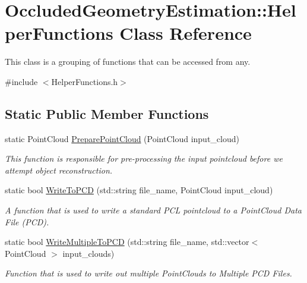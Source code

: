 \hypertarget{class_occluded_geometry_estimation_1_1_helper_functions}{\section{\-Occluded\-Geometry\-Estimation\-:\-:\-Helper\-Functions \-Class \-Reference}
\label{class_occluded_geometry_estimation_1_1_helper_functions}
}


\-This class is a grouping of functions that can be accessed from any.  




{\ttfamily \#include $<$\-Helper\-Functions.\-h$>$}

\subsection*{\-Static \-Public \-Member \-Functions}
\begin{DoxyCompactItemize}
\item 
static \-Point\-Cloud \hyperlink{class_occluded_geometry_estimation_1_1_helper_functions_a1b791fa5ecdce8f72bd9e876ccb44692}{\-Prepare\-Point\-Cloud} (\-Point\-Cloud input\-\_\-cloud)
\begin{DoxyCompactList}\small\item\em \-This function is responsible for pre-\/processing the input pointcloud before we attempt object reconstruction. \end{DoxyCompactList}\item 
static bool \hyperlink{class_occluded_geometry_estimation_1_1_helper_functions_a3c5696db450358453fdd9da360435ba7}{\-Write\-To\-P\-C\-D} (std\-::string file\-\_\-name, \-Point\-Cloud input\-\_\-cloud)
\begin{DoxyCompactList}\small\item\em \-A function that is used to write a standard \-P\-C\-L pointcloud to a \-Point\-Cloud \-Data \-File (\-P\-C\-D). \end{DoxyCompactList}\item 
static bool \hyperlink{class_occluded_geometry_estimation_1_1_helper_functions_a99941df03975253f2c7c3624c959ebfe}{\-Write\-Multiple\-To\-P\-C\-D} (std\-::string file\-\_\-name, std\-::vector$<$ \-Point\-Cloud $>$ input\-\_\-clouds)
\begin{DoxyCompactList}\small\item\em \-Function that is used to write out multiple \-Point\-Clouds to \-Multiple \-P\-C\-D \-Files. \end{DoxyCompactList}\end{DoxyCompactItemize}



